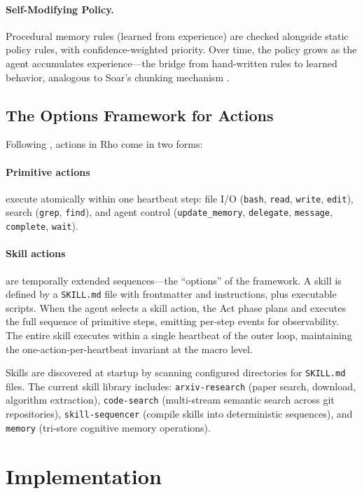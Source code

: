 \documentclass[letterpaper]{article}
\begin{document}
\paragraph{Self-Modifying Policy.} Procedural memory rules (learned from experience) are checked alongside static policy rules, with confidence-weighted priority. Over time, the policy grows as the agent accumulates experience---the bridge from hand-written rules to learned behavior, analogous to Soar's chunking mechanism \citep{laird1986chunking}.

\subsection{The Options Framework for Actions}
\label{sec:options}

Following \citet{sutton1999between}, actions in Rho come in two forms:

\paragraph{Primitive actions} execute atomically within one heartbeat step: file I/O (\texttt{bash}, \texttt{read}, \texttt{write}, \texttt{edit}), search (\texttt{grep}, \texttt{find}), and agent control (\texttt{update\_memory}, \texttt{delegate}, \texttt{message}, \texttt{complete}, \texttt{wait}).

\paragraph{Skill actions} are temporally extended sequences---the ``options'' of the framework. A skill is defined by a \texttt{SKILL.md} file with frontmatter and instructions, plus executable scripts. When the agent selects a skill action, the Act phase plans and executes the full sequence of primitive steps, emitting per-step events for observability. The entire skill executes within a single heartbeat of the outer loop, maintaining the one-action-per-heartbeat invariant at the macro level.

Skills are discovered at startup by scanning configured directories for \texttt{SKILL.md} files. The current skill library includes: \texttt{arxiv-research} (paper search, download, algorithm extraction), \texttt{code-search} (multi-stream semantic search across git repositories), \texttt{skill-sequencer} (compile skills into deterministic sequences), and \texttt{memory} (tri-store cognitive memory operations).


\section{Implementation}
\end{document}
